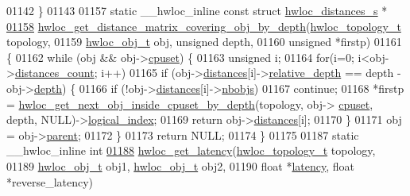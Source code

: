 \begin{DoxyCode}
01142 \}
01143 
01157 \textcolor{keyword}{static} \_\_hwloc\_inline \textcolor{keyword}{const} \textcolor{keyword}{struct }\hyperlink{a00014}{hwloc_distances_s} *
\hypertarget{a00031_source_l01158}{}\hyperlink{a00063_ga186ac2711b98a12cf46d58cd005fbb51}{01158} \hyperlink{a00063_ga186ac2711b98a12cf46d58cd005fbb51}{hwloc_get_distance_matrix_covering_obj_by_depth}(\hyperlink{a00039_ga9d1e76ee15a7dee158b786c30b6a6e38}{hwloc_topology_t} topology,
01159                                                 \hyperlink{a00016}{hwloc_obj_t} obj, \textcolor{keywordtype}{unsigned} depth,
01160                                                 \textcolor{keywordtype}{unsigned} *firstp)
01161 \{
01162   \textcolor{keywordflow}{while} (obj && obj->\hyperlink{a00016_a67925e0f2c47f50408fbdb9bddd0790f}{cpuset}) \{
01163     \textcolor{keywordtype}{unsigned} i;
01164     \textcolor{keywordflow}{for}(i=0; i<obj->\hyperlink{a00016_a8be6f63eca4da91000c832280db927b7}{distances_count}; i++)
01165       \textcolor{keywordflow}{if} (obj->\hyperlink{a00016_a9a5dd75596edc48fe834f81988cdc0d6}{distances}[i]->\hyperlink{a00014_a6fe066eaf62ee448aa05bab8e7217ff7}{relative_depth} == depth - obj->\hyperlink{a00016_a9d82690370275d42d652eccdea5d3ee5}{depth}) \{
01166         \textcolor{keywordflow}{if} (!obj->\hyperlink{a00016_a9a5dd75596edc48fe834f81988cdc0d6}{distances}[i]->\hyperlink{a00014_a4ca2af858cebbce7324ec49903d09474}{nbobjs})
01167           \textcolor{keywordflow}{continue};
01168         *firstp = \hyperlink{a00054_ga8af256c2572f16520f95440b884c1bd6}{hwloc_get_next_obj_inside_cpuset_by_depth}(topology, obj->
      \hyperlink{a00016_a67925e0f2c47f50408fbdb9bddd0790f}{cpuset}, depth, NULL)->\hyperlink{a00016_a0d07fb7b8935e137c94d75a3eb492ae9}{logical_index};
01169         \textcolor{keywordflow}{return} obj->\hyperlink{a00016_a9a5dd75596edc48fe834f81988cdc0d6}{distances}[i];
01170       \}
01171     obj = obj->\hyperlink{a00016_adc494f6aed939992be1c55cca5822900}{parent};
01172   \}
01173   \textcolor{keywordflow}{return} NULL;
01174 \}
01175 
01187 \textcolor{keyword}{static} \_\_hwloc\_inline \textcolor{keywordtype}{int}
\hypertarget{a00031_source_l01188}{}\hyperlink{a00063_ga9addde99e34b815df47625f1d6191839}{01188} \hyperlink{a00063_ga9addde99e34b815df47625f1d6191839}{hwloc_get_latency}(\hyperlink{a00039_ga9d1e76ee15a7dee158b786c30b6a6e38}{hwloc_topology_t} topology,
01189                    \hyperlink{a00016}{hwloc_obj_t} obj1, \hyperlink{a00016}{hwloc_obj_t} obj2,
01190                    \textcolor{keywordtype}{float} *\hyperlink{a00014_a0f70f48d1bfb18e5e2008825da2967c9}{latency}, \textcolor{keywordtype}{float} *reverse\_latency)

\end{DoxyCode}
